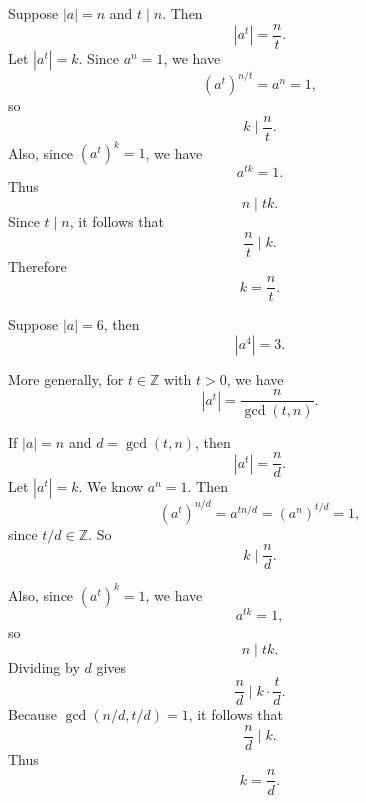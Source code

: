 \begin{theorem}{
    Suppose $|a|=n$ and $t\mid n$.
    Then
    \[
        |a^t|=\frac{n}{t}.
    \]
}
    Let $|a^t|=k$.
    Since $a^n=1$, we have
    \[
        (a^t)^{n/t}=a^n=1,
    \]
    so
    \[
        k\mid \frac{n}{t}.
    \]
    Also, since $(a^t)^k=1$, we have
    \[
        a^{tk}=1.
    \]
    Thus
    \[
        n\mid tk.
    \]
    Since $t\mid n$, it follows that
    \[
        \frac{n}{t}\mid k.
    \]
    Therefore
    \[
        k=\frac{n}{t}.
    \]
\end{theorem}

Suppose $|a|=6$, then
\[
    |a^4|=3.
\]

More generally, for $t\in\mathbb{Z}$ with $t>0$, we have
\[
    |a^t|=\frac{n}{\gcd(t,n)}.
\]

\begin{proposition}{
    If $|a|=n$ and $d=\gcd(t,n)$, then
    \[
        |a^t|=\frac{n}{d}.
    \]
}
    Let $|a^t|=k$.
    We know $a^n=1$.
    Then
    \[
        (a^t)^{n/d}=a^{tn/d}=\left(a^n\right)^{t/d}=1,
    \]
    since $t/d\in\mathbb{Z}$.
    So
    \[
        k\mid \frac{n}{d}.
    \]

    Also, since $(a^t)^k=1$, we have
    \[
        a^{tk}=1,
    \]
    so
    \[
        n\mid tk.
    \]
    Dividing by $d$ gives
    \[
        \frac{n}{d}\mid k\cdot \frac{t}{d}.
    \]
    Because $\gcd(n/d,t/d)=1$, it follows that
    \[
        \frac{n}{d}\mid k.
    \]
    Thus
    \[
        k=\frac{n}{d}.
    \]
\end{proposition}